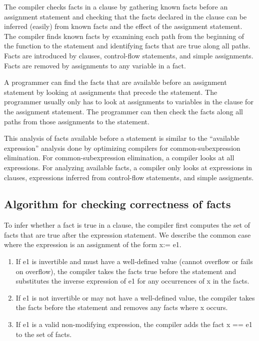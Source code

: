 The compiler checks facts in a  clause by gathering known
facts before an assignment statement and checking that the facts
declared in the  clause can be inferred (easily) from
known facts and the effect of the assignment statement. The compiler
finds known facts by examining each path from the beginning of the
function to the statement and identifying facts that are true along all
paths. Facts are introduced by  clauses, control-flow
statements, and simple assignments. Facts are removed by assignments to any
variable in a fact.

A programmer can find the facts that are available before an assignment
statement by looking at assignments that precede the statement. The
programmer usually only has to look at assignments to variables in the
 clause for the assignment statement. The programmer can then check
the facts along all paths from those assignments to the statement.

This analysis of facts available before a statement is similar to the
``available expression'' analysis done by optimizing compilers for
common-subexpression elimination. For common-subexpression elimination,
a compiler looks at all expressions. For analyzing available facts, a
compiler only looks at expressions in  clauses, expressions
inferred from control-flow statements, and simple assigments.

\subsection{Algorithm for checking correctness of facts}

To infer whether a fact is true in a  clause, the compiler first
computes the set of facts that are true after the expression statement.
We describe the common case where the expression is an assignment of the
form x:= e1.

\begin{enumerate}
\item
  If e1 is invertible and must have a well-defined value (cannot
  overflow or fails on overflow), the compiler takes the facts true
  before the statement and substitutes the inverse expression of e1 for
  any occurrences of x in the facts.
\item
  If e1 is not invertible or may not have a well-defined value, the
  compiler takes the facts before the statement and removes any facts
  where x occurs.
\item
  If e1 is a valid non-modifying expression, the compiler adds the fact
  x == e1 to the set of facts.
\end{enumerate}

